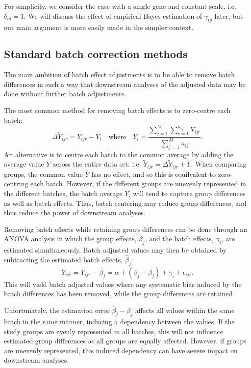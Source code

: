 \documentclass{bio}
\begin{document}
For simplicity, we consider the case with a single gene and constant scale, i.e. $\delta_{ig}=1$. We will discuss the effect of empirical Bayes estimation of $\gamma_{ig}$ later, but out main argument is more easily made in the simpler context.

\subsection{Standard batch correction methods}

The main ambition of batch effect adjustments is to be able to remove batch differences in such a way that downstream analyses of the adjusted data may be done without further batch adjustments.

The most common method for removing batch effects is to zero-centre each batch:
\begin{equation}
\Delta\widetilde Y_{ijr}=Y_{ijr}-\overline{Y}_{i}
\quad\text{where}\quad
\bar Y_i=\frac{\sum_{j=1}^M\sum_{r=1}^{n_{ij}} Y_{ijr}}{\sum_{j=1}^M n_{ij}}.
\end{equation}
An alternative is to centre each batch to the common average by adding the average value $\bar Y$ across the entire data set: i.e. $\widetilde Y_{ijr}=\Delta\widetilde Y_{ijr}+\bar Y$. When comparing groups, the common value $\bar Y$ has no effect, and so this is equilvalent to zero-centring each batch. However, if the different groups are unevenly represented in the different batches, the batch average $\overline{Y}_i$ will tend to capture group differences as well as batch effects. Thus, batch centering may reduce group differences, and thus reduce the power of downstream analyses.

Removing batch effects while retaining group differences can be done through an ANOVA analysis in which the group effects, $\beta_j$, and the batch effects, $\gamma_i$, are estimated simultaneously. Batch adjusted values may then be obtained by subtracting the estimated batch effects, $\hat\beta_j$:
\begin{equation}
\widetilde Y_{ijr}=Y_{ijr}-\hat\beta_j=\alpha+(\beta_j-\hat\beta_j)+\gamma_i+\epsilon_{ijr}.
\end{equation}
This will yield batch adjusted values where any systematic bias induced by the batch differences has been removed, while the group differences are retained.

Unfortunately, the estimation error $\hat\beta_j-\beta_j$ affects all values within the same batch in the same manner, inducing a dependency between the values. If the study groups are evenly represented in all batches, this will not influence estimated group differences as all groups are equally affected. However, if groups are unevenly represented, this induced dependency can have severe impact on downstream analyses.
\end{document}
